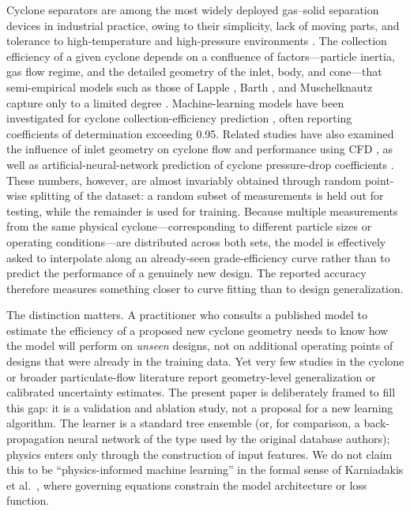 \documentclass[12pt]{article}
\begin{document}
Cyclone separators are among the most widely deployed gas--solid separation devices in industrial practice, owing to their simplicity, lack of moving parts, and tolerance to high-temperature and high-pressure environments \cite{hoffmann}. The collection efficiency of a given cyclone depends on a confluence of factors---particle inertia, gas flow regime, and the detailed geometry of the inlet, body, and cone---that semi-empirical models such as those of Lapple \cite{lapple}, Barth \cite{barth}, and Muschelknautz \cite{muschel} capture only to a limited degree \cite{hoffmann92,dirgo}. Machine-learning models have been investigated for cyclone collection-efficiency prediction \cite{bregolin}, often reporting coefficients of determination exceeding 0.95. Related studies have also examined the influence of inlet geometry on cyclone flow and performance using CFD \cite{elsayed}, as well as artificial-neural-network prediction of cyclone pressure-drop coefficients \cite{zhao}. These numbers, however, are almost invariably obtained through random point-wise splitting of the dataset: a random subset of measurements is held out for testing, while the remainder is used for training. Because multiple measurements from the same physical cyclone---corresponding to different particle sizes or operating conditions---are distributed across both sets, the model is effectively asked to interpolate along an already-seen grade-efficiency curve rather than to predict the performance of a genuinely new design. The reported accuracy therefore measures something closer to curve fitting than to design generalization.

The distinction matters. A practitioner who consults a published model to estimate the efficiency of a proposed new cyclone geometry needs to know how the model will perform on \emph{unseen} designs, not on additional operating points of designs that were already in the training data. Yet very few studies in the cyclone or broader particulate-flow literature report geometry-level generalization or calibrated uncertainty estimates. The present paper is deliberately framed to fill this gap: it is a validation and ablation study, not a proposal for a new learning algorithm. The learner is a standard tree ensemble (or, for comparison, a back-propagation neural network of the type used by the original database authors); physics enters only through the construction of input features. We do not claim this to be ``physics-informed machine learning'' in the formal sense of Karniadakis et al.\ \cite{karniadakis}, where governing equations constrain the model architecture or loss function.
\end{document}
